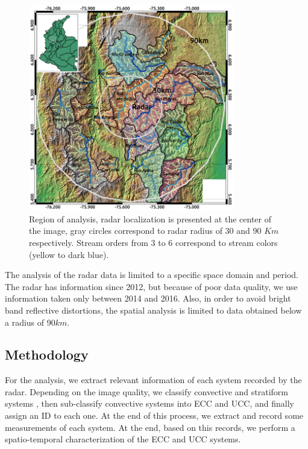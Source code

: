 \documentclass[preprint,12pt]{elsarticle}
\begin{document}
\begin{figure}[t]
\centering
    \includegraphics[width=9cm]{Figuras/Analysis_Region.png}
    \caption{Region of analysis, radar localization is presented at the center of the image, gray circles correspond to radar radius of 30 and 90 $Km$ respectively.  Stream orders from 3 to 6 correspond to stream colors (yellow to dark blue).}
    \label{fig:localization}
\end{figure}

The analysis of the radar data is limited to a specific space domain and period.  The radar has information since 2012, but because of poor data quality, we use information taken only between 2014 and 2016.  Also, in order to avoid bright band reflective distortions, the spatial analysis is limited to data obtained below a radius of 90$km$.\\  
 
\subsection{Methodology}
\label{metod}

For the analysis, we extract relevant information of each system recorded by the radar. Depending on the image quality, we classify convective and stratiform systems \citep{Steiner1995}, then sub-classify convective systems into ECC and UCC, and finally assign an ID to each one. At the end of this process, we extract and record some measurements of each system.  At the end, based on this records, we perform a spatio-temporal characterization of the ECC and UCC systems.\\    
\end{document}
